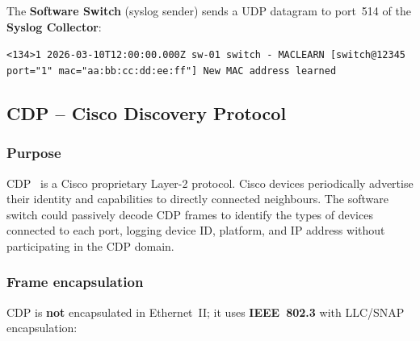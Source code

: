 \documentclass[12pt,a4paper]{article}
\begin{document}
The \textbf{Software Switch} (syslog sender) sends a
UDP datagram to port~514 of the \textbf{Syslog Collector}:

\begin{center}
\small\texttt{<134>1 2026-03-10T12:00:00.000Z sw-01 switch - MACLEARN
[switch@12345 port="1" mac="aa:bb:cc:dd:ee:ff"] New MAC address learned}
\end{center}

\subsection{CDP -- Cisco Discovery Protocol}

\subsubsection{Purpose}

CDP~\cite{cdp} is a Cisco proprietary Layer-2 protocol.  Cisco devices
periodically advertise their identity and capabilities to directly connected
neighbours.  The software switch could passively decode CDP frames to identify
the types of devices connected to each port, logging device ID, platform, and
IP address without participating in the CDP domain.

\subsubsection{Frame encapsulation}

CDP is \textbf{not} encapsulated in Ethernet~II; it uses
\textbf{IEEE~802.3} with LLC/SNAP encapsulation:

\begin{center}
\end{center}
\end{document}
